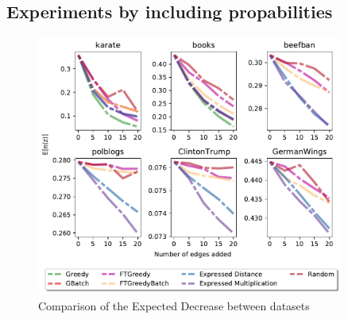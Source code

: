 \subsection{Experiments by including propabilities}
\label{probexperiment}

\begin{figure}[!htbp]
	\centering
	\captionsetup{justification=centering,margin=2cm}
	\includegraphics[width=0.90\textwidth]{Figures/embeddings_small}
	\caption{Comparison of the Expected Decrease between datasets}
	\label{fig:embeddings_smalll}
\end{figure}


\clearpage
